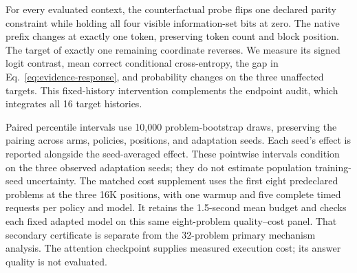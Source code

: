 For every evaluated context, the counterfactual probe flips one declared
parity constraint while holding all four visible information-set bits at zero.
The native prefix changes at exactly one token, preserving token count and
block position. The target of exactly one remaining coordinate reverses.
We measure its signed logit contrast, mean correct conditional cross-entropy,
the gap in Eq.~\eqref{eq:evidence-response}, and probability changes on the
three unaffected targets. This fixed-history intervention complements the
endpoint audit, which integrates all 16 target histories.

Paired percentile intervals use 10,000 problem-bootstrap draws, preserving
the pairing across arms, policies, positions, and adaptation seeds. Each
seed's effect is reported alongside the seed-averaged effect. These
pointwise intervals condition on the three observed adaptation seeds;
they do not estimate population training-seed uncertainty.
The matched cost supplement uses the first eight predeclared problems at
the three 16K positions, with one warmup and five complete timed requests
per policy and model. It retains the 1.5-second mean budget and checks each
fixed adapted model on this same eight-problem quality--cost panel.
That secondary certificate is separate from the 32-problem primary
mechanism analysis. The attention checkpoint supplies measured execution
cost; its answer quality is not evaluated.
